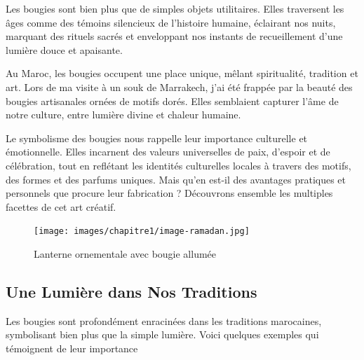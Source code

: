 \documentclass[11pt,fleqn,onecolumn,oneside]{book}
\begin{document}
\begin{definition} Les bougies sont bien plus que de simples objets utilitaires. Elles traversent les âges comme des témoins silencieux de l’histoire humaine, éclairant nos nuits, marquant des rituels sacrés et enveloppant nos instants de recueillement d’une lumière douce et apaisante. \end{definition}

\begin{remark} Au Maroc, les bougies occupent une place unique, mêlant spiritualité, tradition et art. Lors de ma visite à un souk de Marrakech, j’ai été frappée par la beauté des bougies artisanales ornées de motifs dorés. Elles semblaient capturer l’âme de notre culture, entre lumière divine et chaleur humaine. \end{remark}

\begin{remark} Le symbolisme des bougies nous rappelle leur importance culturelle et émotionnelle. Elles incarnent des valeurs universelles de paix, d’espoir et de célébration, tout en reflétant les identités culturelles locales à travers des motifs, des formes et des parfums uniques. Mais qu’en est-il des avantages pratiques et personnels que procure leur fabrication ? Découvrons ensemble les multiples facettes de cet art créatif. \end{remark}

\begin{figure}[htbp]
    \centering
    \texttt{[image: images/chapitre1/image-ramadan.jpg]}
    \caption{Lanterne ornementale avec bougie allumée}
    \label{fig:image_lanterne}
\end{figure}


\subsection*{Une Lumière dans Nos Traditions}

Les bougies sont profondément enracinées dans les traditions marocaines, symbolisant bien plus que la simple lumière. Voici quelques exemples qui témoignent de leur importance
\end{document}
